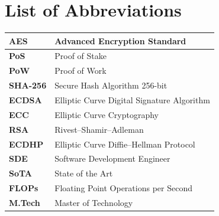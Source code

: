 \chapter*{List of Abbreviations}

\noindent
\begingroup
\renewcommand{\arraystretch}{1.25} %
\begin{tabular}{|p{3.5cm}|p{10.5cm}|} %
    \hline
    \textbf{AES}    & Advanced Encryption Standard \\ \hline
    \textbf{PoS}    & Proof of Stake \\ \hline
    \textbf{PoW}    & Proof of Work \\ \hline
    \textbf{SHA-256} & Secure Hash Algorithm 256-bit \\ \hline
    \textbf{ECDSA}  & Elliptic Curve Digital Signature Algorithm \\ \hline
    \textbf{ECC}    & Elliptic Curve Cryptography \\ \hline
    \textbf{RSA}    & Rivest--Shamir--Adleman \\ \hline
    \textbf{ECDHP}  & Elliptic Curve Diffie--Hellman Protocol \\ \hline
    \textbf{SDE}    & Software Development Engineer \\ \hline
    \textbf{SoTA}   & State of the Art \\ \hline
    \textbf{FLOPs}  & Floating Point Operations per Second \\ \hline
    \textbf{M.Tech} & Master of Technology \\ \hline
\end{tabular}
\endgroup